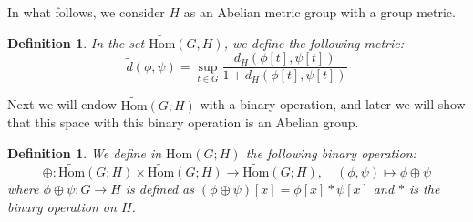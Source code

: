 \documentclass{article}
\newtheorem{definition}[theorem]{Definition}
\numberwithin{theorem}{section}
\numberwithin{equation}{section}
\begin{document}
In what follows, we consider $H$ as an Abelian metric group with a group metric.

\begin{definition}
In the set $\tilde{\mathrm{Hom}}(G, H)$, we define the following metric:
\[
\tilde{d}(\phi, \psi) = \sup_{t\in G} \frac{d_H(\phi[t], \psi[t])}{1 + d_H(\phi[t], \psi[t])}
\]
\end{definition}

Next we will endow $\tilde{\mathrm{Hom}}(G; H)$ with a binary operation, and later we will show that this space with this binary operation is an Abelian group.

\begin{definition}
We define in $\tilde{\mathrm{Hom}}(G; H)$ the following binary operation:
\[
\oplus: \tilde{\mathrm{Hom}}(G; H) \times \tilde{\mathrm{Hom}}(G; H) \to \tilde{\mathrm{Hom}}(G; H),\quad (\phi, \psi) \mapsto \phi \oplus \psi
\]
where $\phi \oplus \psi : G \to H$ is defined as $(\phi \oplus \psi)[x] = \phi[x] \ast \psi[x]$ and $\ast$ is the binary operation on $H$.
\end{definition}
\end{document}
